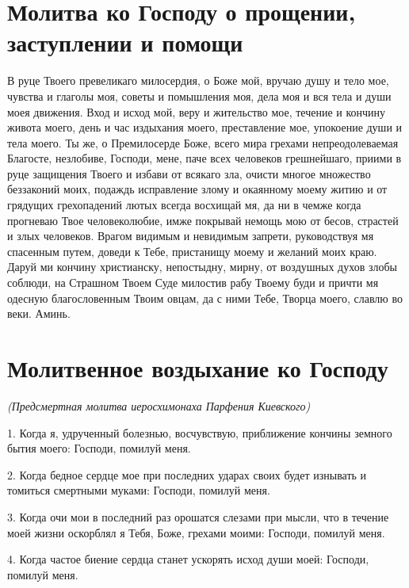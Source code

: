 \section{Молитва ко Господу о прощении, заступлении и помощи}
 


В руце Твоего превеликаго милосердия, о Боже мой, вручаю душу и тело мое, чувства и глаголы моя, советы и помышления моя, дела моя и вся тела и души моея движения. Вход и исход мой, веру и жительство мое, течение и кончину живота моего, день и час издыхания моего, преставление мое, упокоение души и тела моего. Ты же, о Премилосерде Боже, всего мира грехами непреодолеваемая Благосте, незлобиве, Господи, мене, паче всех человеков грешнейшаго, приими в руце защищения Твоего и избави от всякаго зла, очисти многое множество беззаконий моих, подаждь исправление злому и окаянному моему житию и от грядущих грехопадений лютых всегда восхищай мя, да ни в чемже когда прогневаю Твое человеколюбие, имже покрывай немощь мою от бесов, страстей и злых человеков. Врагом видимым и невидимым запрети, руководствуя мя спасенным путем, доведи к Тебе, пристанищу моему и желаний моих краю. Даруй ми кончину христианску, непостыдну, мирну, от воздушных духов злобы соблюди, на Страшном Твоем Суде милостив рабу Твоему буди и причти мя одесную благословенным Твоим овцам, да с ними Тебе, Творца моего, славлю во веки. Аминь.





\section{Молитвенное воздыхание ко Господу}
 


\itshape (Предсмертная молитва иеросхимонаха Парфения Киевско\normalfont{}го)


1. Когда я, удрученный болезнью, восчувствую, приближение кончины земного бытия моего: Господи, помилуй меня. 

2. Когда бедное сердце мое при последних ударах своих будет изнывать и томиться смертными муками: Господи, помилуй меня. 

3. Когда очи мои в последний раз орошатся слезами при мысли, что в течение моей жизни оскорблял я Тебя, Боже, грехами моими: Господи, помилуй меня. 

4. Когда частое биение сердца станет ускорять исход души моей: Господи, помилуй меня. 

